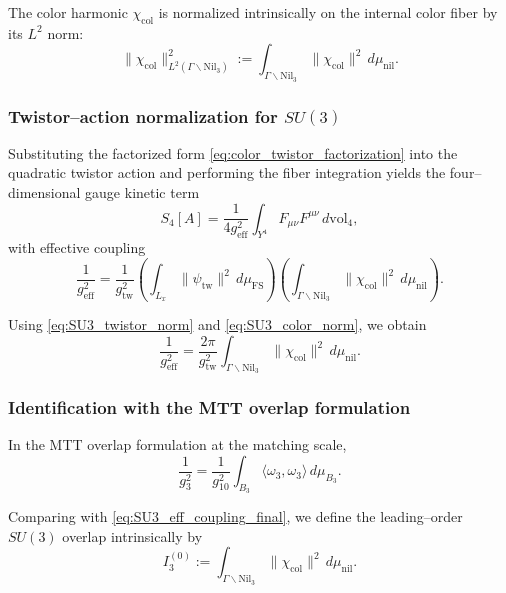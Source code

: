 \documentclass[11pt]{article}
\begin{document}
The color harmonic $\chi_{\mathrm{col}}$ is normalized intrinsically on the
internal color fiber by its $L^2$ norm:
\begin{equation}
\|\chi_{\mathrm{col}}\|_{L^2(\Gamma\backslash\mathrm{Nil}_3)}^2
:=
\int_{\Gamma\backslash\mathrm{Nil}_3}
\|\chi_{\mathrm{col}}\|^2\, d\mu_{\mathrm{nil}}.
\label{eq:SU3_color_norm}
\end{equation}

\subsubsection{Twistor--action normalization for $SU(3)$}

Substituting the factorized form \eqref{eq:color_twistor_factorization} into the
quadratic twistor action and performing the fiber integration yields the
four--dimensional gauge kinetic term
\begin{equation}
S_4[A]
=
\frac{1}{4g_{\mathrm{eff}}^2}
\int_{Y^4} F_{\mu\nu}F^{\mu\nu}\, d\mathrm{vol}_4,
\end{equation}
with effective coupling
\begin{equation}
\frac{1}{g_{\mathrm{eff}}^2}
=
\frac{1}{g_{\mathrm{tw}}^2}
\left(
\int_{L_x}\|\psi_{\mathrm{tw}}\|^2\, d\mu_{\mathrm{FS}}
\right)
\left(
\int_{\Gamma\backslash\mathrm{Nil}_3}
\|\chi_{\mathrm{col}}\|^2\, d\mu_{\mathrm{nil}}
\right).
\label{eq:SU3_eff_coupling}
\end{equation}

Using \eqref{eq:SU3_twistor_norm} and \eqref{eq:SU3_color_norm}, we obtain
\begin{equation}
\frac{1}{g_{\mathrm{eff}}^2}
=
\frac{2\pi}{g_{\mathrm{tw}}^2}
\int_{\Gamma\backslash\mathrm{Nil}_3}
\|\chi_{\mathrm{col}}\|^2\, d\mu_{\mathrm{nil}}.
\label{eq:SU3_eff_coupling_final}
\end{equation}

\subsubsection{Identification with the MTT overlap formulation}

In the MTT overlap formulation at the matching scale,
\begin{equation}
\frac{1}{g_3^2}
=
\frac{1}{g_{10}^2}
\int_{B_3}
\langle \omega_3, \omega_3 \rangle\, d\mu_{B_3}.
\end{equation}

Comparing with \eqref{eq:SU3_eff_coupling_final}, we define the leading--order
$SU(3)$ overlap intrinsically by
\begin{equation}
I_3^{(0)}
:=
\int_{\Gamma\backslash\mathrm{Nil}_3}
\|\chi_{\mathrm{col}}\|^2\, d\mu_{\mathrm{nil}}.
\label{eq:SU3_overlap_def}
\end{equation}
\end{document}
